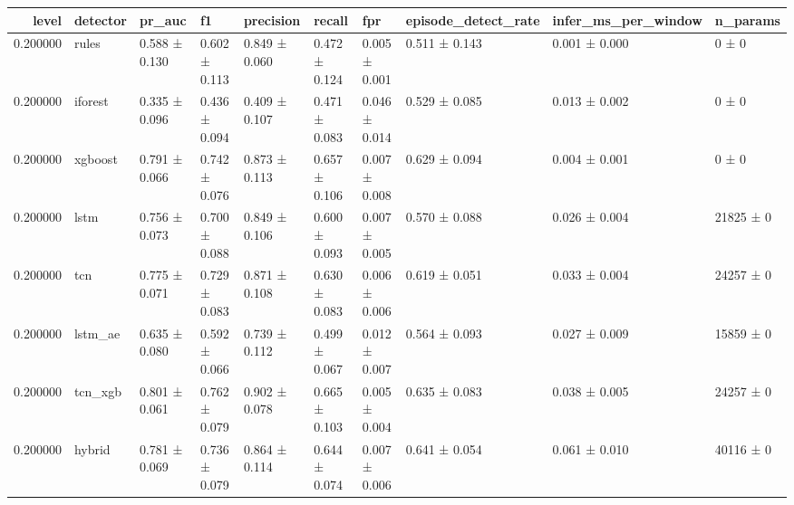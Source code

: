 \begin{tabular}{rlllllllll}
\toprule
level & detector & pr\_auc & f1 & precision & recall & fpr & episode\_detect\_rate & infer\_ms\_per\_window & n\_params \\
\midrule
0.200000 & rules & 0.588 ± 0.130 & 0.602 ± 0.113 & 0.849 ± 0.060 & 0.472 ± 0.124 & 0.005 ± 0.001 & 0.511 ± 0.143 & 0.001 ± 0.000 & 0 ± 0 \\
0.200000 & iforest & 0.335 ± 0.096 & 0.436 ± 0.094 & 0.409 ± 0.107 & 0.471 ± 0.083 & 0.046 ± 0.014 & 0.529 ± 0.085 & 0.013 ± 0.002 & 0 ± 0 \\
0.200000 & xgboost & 0.791 ± 0.066 & 0.742 ± 0.076 & 0.873 ± 0.113 & 0.657 ± 0.106 & 0.007 ± 0.008 & 0.629 ± 0.094 & 0.004 ± 0.001 & 0 ± 0 \\
0.200000 & lstm & 0.756 ± 0.073 & 0.700 ± 0.088 & 0.849 ± 0.106 & 0.600 ± 0.093 & 0.007 ± 0.005 & 0.570 ± 0.088 & 0.026 ± 0.004 & 21825 ± 0 \\
0.200000 & tcn & 0.775 ± 0.071 & 0.729 ± 0.083 & 0.871 ± 0.108 & 0.630 ± 0.083 & 0.006 ± 0.006 & 0.619 ± 0.051 & 0.033 ± 0.004 & 24257 ± 0 \\
0.200000 & lstm\_ae & 0.635 ± 0.080 & 0.592 ± 0.066 & 0.739 ± 0.112 & 0.499 ± 0.067 & 0.012 ± 0.007 & 0.564 ± 0.093 & 0.027 ± 0.009 & 15859 ± 0 \\
0.200000 & tcn\_xgb & 0.801 ± 0.061 & 0.762 ± 0.079 & 0.902 ± 0.078 & 0.665 ± 0.103 & 0.005 ± 0.004 & 0.635 ± 0.083 & 0.038 ± 0.005 & 24257 ± 0 \\
0.200000 & hybrid & 0.781 ± 0.069 & 0.736 ± 0.079 & 0.864 ± 0.114 & 0.644 ± 0.074 & 0.007 ± 0.006 & 0.641 ± 0.054 & 0.061 ± 0.010 & 40116 ± 0 \\
\bottomrule
\end{tabular}
